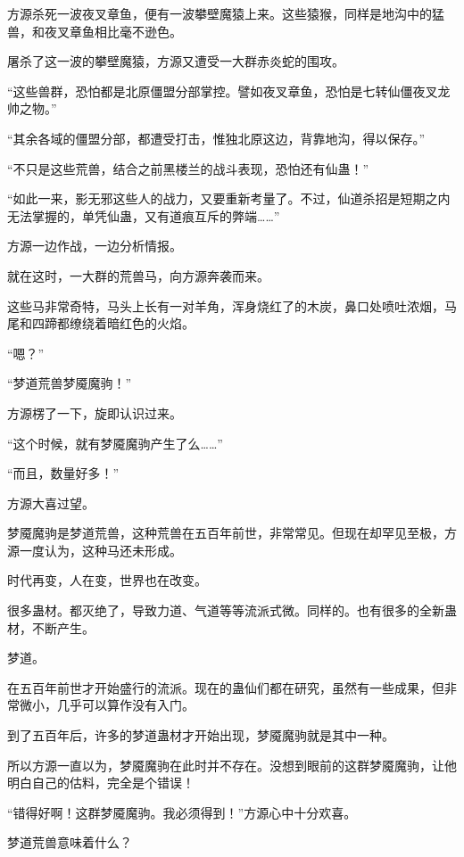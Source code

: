 
\begin{this_body}



方源杀死一波夜叉章鱼，便有一波攀壁魔猿上来。这些猿猴，同样是地沟中的猛兽，和夜叉章鱼相比毫不逊色。

屠杀了这一波的攀壁魔猿，方源又遭受一大群赤炎蛇的围攻。

“这些兽群，恐怕都是北原僵盟分部掌控。譬如夜叉章鱼，恐怕是七转仙僵夜叉龙帅之物。”

“其余各域的僵盟分部，都遭受打击，惟独北原这边，背靠地沟，得以保存。”

“不只是这些荒兽，结合之前黑楼兰的战斗表现，恐怕还有仙蛊！”

“如此一来，影无邪这些人的战力，又要重新考量了。不过，仙道杀招是短期之内无法掌握的，单凭仙蛊，又有道痕互斥的弊端……”

方源一边作战，一边分析情报。

就在这时，一大群的荒兽马，向方源奔袭而来。

这些马非常奇特，马头上长有一对羊角，浑身烧红了的木炭，鼻口处喷吐浓烟，马尾和四蹄都缭绕着暗红色的火焰。

“嗯？”

“梦道荒兽梦魇魔驹！”

方源楞了一下，旋即认识过来。

“这个时候，就有梦魇魔驹产生了么……”

“而且，数量好多！”

方源大喜过望。

梦魇魔驹是梦道荒兽，这种荒兽在五百年前世，非常常见。但现在却罕见至极，方源一度认为，这种马还未形成。

时代再变，人在变，世界也在改变。

很多蛊材。都灭绝了，导致力道、气道等等流派式微。同样的。也有很多的全新蛊材，不断产生。

梦道。

在五百年前世才开始盛行的流派。现在的蛊仙们都在研究，虽然有一些成果，但非常微小，几乎可以算作没有入门。

到了五百年后，许多的梦道蛊材才开始出现，梦魇魔驹就是其中一种。

所以方源一直以为，梦魇魔驹在此时并不存在。没想到眼前的这群梦魇魔驹，让他明白自己的估料，完全是个错误！

“错得好啊！这群梦魇魔驹。我必须得到！”方源心中十分欢喜。

梦道荒兽意味着什么？


\end{this_body}
